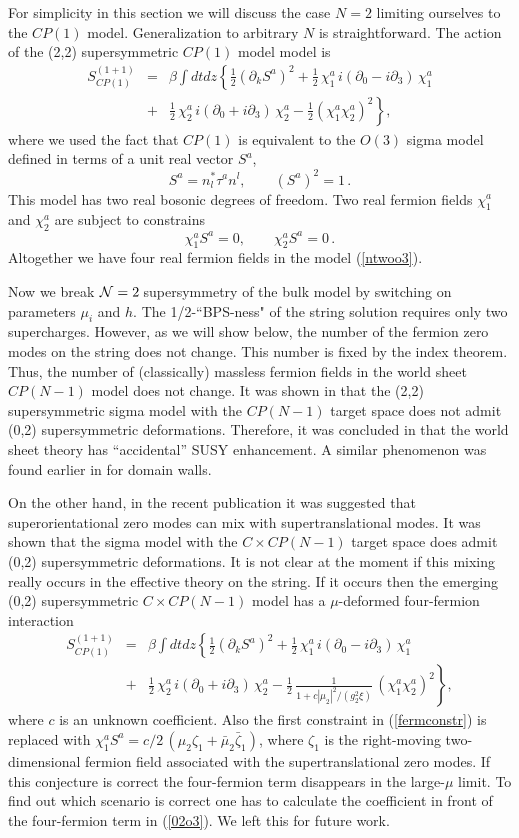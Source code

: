 \documentclass[epsfig,12pt]{article}
\def\beqn{\begin{eqnarray}}
\def\eeqn{\end{eqnarray}}
\def\beq{\begin{equation}}
\def\eeq{\end{equation}}
\newcommand{\ntwo}{${\cal N}=2\;$}
\newcommand{\pt}{\partial}
\begin{document}
\vspace{2mm}

For simplicity in this section we will discuss the case $N=2$ limiting ourselves  
to the $CP(1)$ model. Generalization to arbitrary $N$ is straightforward.
The action of the (2,2) supersymmetric $CP(1)$ model model is
\beqn
S^{(1+1)}_{CP(1)}
&=&
\beta \int d t d z \left\{\frac12 (\pt_k S^a)^2+
\frac12 \, \chi^a_1 \, i(\pt_0-i\pt_3)\, \chi^a_1
\right.
\nonumber\\[3mm]
&+& \left.
\frac12 \, \chi^a_2 \, i(\pt_0+i\pt_3)\, \chi^a_2
-\frac12 (\chi^a_1\chi^a_2)^2
\right\},
\label{ntwoo3}
\eeqn
where we used the fact that $CP(1)$  is equivalent to the $O(3)$ sigma  model
defined in terms of a unit real vector $S^a$,
\beq
S^a=n^{*}_l\tau^a n^l, \qquad (S^a)^2=1\, .
\label{sn}
\eeq
This model has two real bosonic degrees of freedom. Two real fermion fields
$\chi_1^a$ and $\chi_2^a$ are subject to constrains
\beq
\chi_1^aS^a=0, \qquad \chi_2^aS^a=0\,.
\label{fermconstr}
\eeq
Altogether we have four real fermion fields in the model (\ref{ntwoo3}).


Now  we break \ntwo supersymmetry of the bulk model by switching on parameters
 $\mu_i$ and $h$. The 1/2-``BPS-ness" of the string solution
requires only two supercharges. However, as we will show below, the number of the 
fermion zero
modes on the string does not change. This number is fixed by the index theorem.
Thus, the number of (classically) massless fermion fields in the world sheet 
$CP(N-1)$ model does not change. It was shown in \cite{SYnone} that the (2,2) 
supersymmetric
sigma model with the $CP(N-1)$ target space does not admit (0,2) supersymmetric 
deformations.
Therefore, it was concluded in \cite{SYnone} that the world sheet theory has
``accidental'' SUSY enhancement. A similar phenomenon was found earlier
 in  \cite{RSV} for domain walls.

On the other hand, in the recent publication \cite{EdT} it was suggested that
superorientational zero modes can mix with supertranslational modes.
It was shown that the sigma model with the $C\times CP(N-1)$ target space does  admit (0,2) 
supersymmetric deformations. It is not clear at the moment if this mixing really
occurs in the effective theory  on the string. If it occurs then the emerging
(0,2) supersymmetric $C\times CP(N-1)$ model has a $\mu$-deformed four-fermion 
interaction
\beqn
S^{(1+1)}_{CP(1)}
&=&
\beta \int d t d z \left\{\frac12 (\pt_k S^a)^2+
\frac12 \, \chi^a_1 \, i(\pt_0-i\pt_3)\, \chi^a_1
\right.
\nonumber\\[3mm]
&+& \left.
\frac12 \, \chi^a_2 \, i(\pt_0+i\pt_3)\, \chi^a_2
-\frac12\,\frac1{1+c|\mu_2|^2/(g^2_2\xi)} \,(\chi^a_1\chi^a_2)^2
\right\},
\label{02o3}
\eeqn
where $c$ is an unknown coefficient. Also the first constraint in (\ref{fermconstr})
is replaced with $\chi_1^a S^a=c/2\,(\mu_2\zeta_1 + \bar{\mu}_2\bar{\zeta}_1)$,
where $\zeta_1$ is the right-moving two-dimensional fermion field associated with
the supertranslational zero modes.
If this conjecture  \cite{EdT} is correct 
the four-fermion term disappears in the large-$\mu$ limit. To find out which scenario is
correct one has to calculate the coefficient in front of the four-fermion term in 
(\ref{02o3}). We left this for future work.
\end{document}
